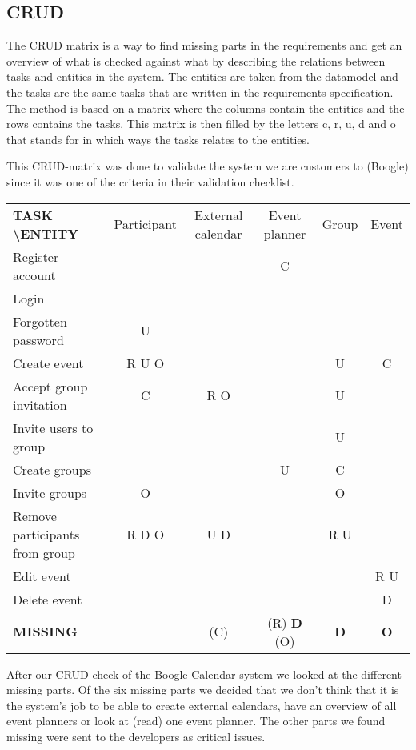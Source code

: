 \documentclass[a4paper]{article}
\begin{document}
			\subsection{CRUD}
				The CRUD matrix is a way to find missing parts in the requirements and get an overview of what is checked against what by describing the relations between tasks and entities in the system. The entities are taken from the datamodel and the tasks are the same tasks that are written in the requirements specification. The method is based on a matrix where the columns contain the entities and the rows contains the tasks. This matrix is then filled by the letters c, r, u, d and o that stands for in which ways the tasks relates to the entities. 
				
				This CRUD-matrix was done to validate the system we are customers to (Boogle) since it was one of the criteria in their validation checklist.
			
	\begin{center}
		
		
			\begin{tabular}{|l||c|c|c|c|c|}
			\hline 
			\textbf{TASK \textbackslash ENTITY} & Participant & External calendar & Event planner & Group & Event \\ 
			\hhline{|=||=|=|=|=|=|}
			Register account & & & C & & \\ 
			\hline 
			Login & & & & & \\ 
			\hline 
			Forgotten password & U & & & & \\ 
			\hline 
			Create event & R U O & & & U & C \\ 
			\hline 
			Accept group invitation & C & R O & & U & \\ 
			\hline 
			Invite users to group & & & & U & \\ 
			\hline 
			Create groups & & & U & C & \\ 
			\hline 
			Invite groups & O & & & O & \\ 
			\hline 
			Remove participants from group & R D O & U D & & R U & \\ 
			\hline 
			Edit event & & & & & R U \\ 
			\hline 
			Delete event & & & & & D \\ 
			\hhline{|=||=|=|=|=|=|}
			\textbf{MISSING} & & (C) & (R) \textbf{D} (O) & \textbf{D} & \textbf{O} \\ 
			\hline 
			\end{tabular} 
	
		\end{center}
			After our CRUD-check of the Boogle Calendar system we looked at the different missing parts. Of the six missing parts we decided that we don't think that it is the system's job to be able to create external calendars, have an overview of all event planners or look at (read) one event planner. The other parts we found missing were sent to the developers as critical issues.
\end{document}
